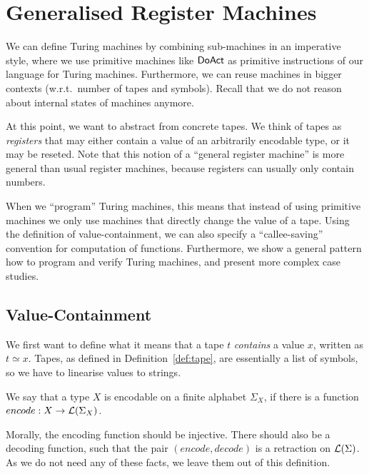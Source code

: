 \chapter{Generalised Register Machines}
\label{chap:programming}


We can define Turing machines by combining sub-machines in an imperative style, where we use primitive machines like $\mathsf{DoAct}$ as primitive
instructions of our language for Turing machines.  Furthermore, we can reuse machines in bigger contexts (w.r.t.\ number of tapes and symbols).
Recall that we do not reason about internal states of machines anymore.

At this point, we want to abstract from concrete tapes.  We think of tapes as \textit{registers} that may either contain a value of an arbitrarily
encodable type, or it may be reseted.  Note that this notion of a ``general register machine'' is more general than usual register machines, because
registers can usually only contain numbers.  %

When we ``program'' Turing machines, this means that instead of using primitive machines we only use machines that directly change the value of a
tape.  Using the definition of value-containment, we can also specify a ``callee-saving'' convention for computation of functions.  Furthermore, we
show a general pattern how to program and verify Turing machines, and present more complex case studies.


\section{Value-Containment}
\label{sec:value-containment}

We first want to define what it means that a tape $t$ \emph{contains} a value $x$, written as $t \simeq x$.  Tapes, as defined in
Definition~\ref{def:tape}, are essentially a list of symbols, so we have to linearise values to strings.

%
\begin{definition}
  \label{def:encodable}
  We say that a type $X$ is encodable on a finite alphabet $\Sigma_X$, if there is a function $encode : X \rightarrow \mathcal{L}(\Sigma_X)$.
\end{definition}

Morally, the encoding function should be injective.  There should also be a decoding function, such that the pair $(encode, decode)$ is a retraction
on $\mathcal{L}(\Sigma)$.  As we do not need any of these facts, we leave them out of this definition.

